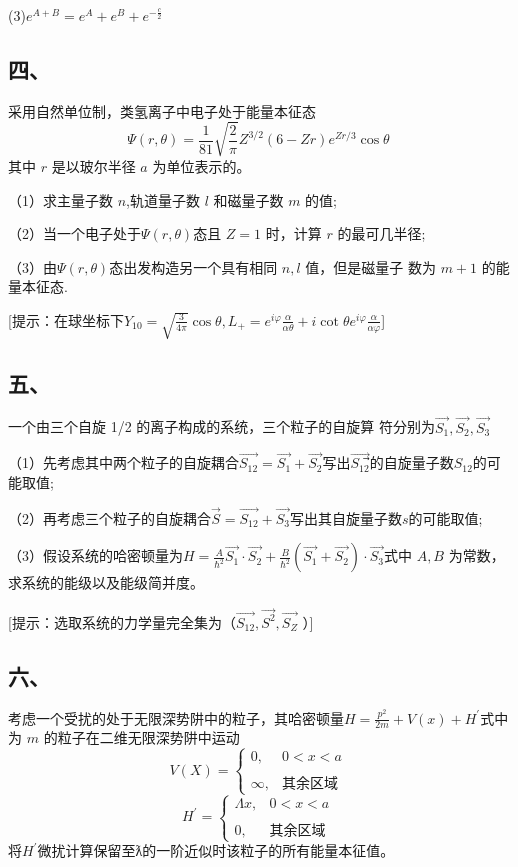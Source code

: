 (3)$e^{A+B} =e^A+e^B+e^{-\frac{c}{2}}$ 
\subsection{四、}

采用自然单位制，类氢离子中电子处于能量本征态
$$\Psi(r,\theta)=\frac{1}{81}\sqrt{\frac{2}{\pi}}Z^{3/2}(6-Zr)e^{Zr/3}\cos\theta~$$
其中 $r$ 是以玻尔半径 $a$ 为单位表示的。

（1）求主量子数 $n$,轨道量子数 $l$ 和磁量子数 $m$ 的值;

（2）当一个电子处于$\Psi(r,\theta)$态且 $Z=1$ 时，计算 $r$ 的最可几半径;

（3）由$\Psi(r,\theta)$态出发构造另一个具有相同 $n,l$ 值，但是磁量子
数为 $m+1$ 的能量本征态.

[提示：在球坐标下$Y_{10}=\sqrt{\frac{3}{4 \pi}}\cos\theta,L_+=e^{i\varphi}\frac{\alpha}{\alpha\theta}+i\cot\theta e^{i\varphi}\frac{\alpha}{\alpha\varphi}$]
\subsection{五、}
一个由三个自旋 1/2 的离子构成的系统，三个粒子的自旋算
符分别为$\vec{S_1},\vec{S_2},\vec{S_3}$

（1）先考虑其中两个粒子的自旋耦合$\vec{S_{12}}=\vec{S_1}+\vec{S_2}$写出$\vec{S_{12}}$⃗的自旋量子数$S_{12}$的可能取值;

（2）再考虑三个粒子的自旋耦合$\vec{S}=\vec{S_12}+\vec{S_3}$写出其自旋量子数$s$的可能取值;

（3）假设系统的哈密顿量为$H=\frac{A}{\hbar^2}\vec{S_1}\cdot\vec{S_2}+\frac{B}{\hbar^2}(\vec{S_1}+\vec{S_2})\cdot\vec{S_3}$式中 $A,B$ 为常数，求系统的能级以及能级简并度。

[提示：选取系统的力学量完全集为（$\vec{S_{12}} , \vec{S^2}  , \vec{S_Z}$ ）]
\subsection{六、}
考虑一个受扰的处于无限深势阱中的粒子，其哈密顿量$H=\frac{p^2}{2m}+V(x)+H^\prime$式中为 $m$ 的粒子在二维无限深势阱中运动
$$V(X)=\begin{cases}
0,&0 < x < a\\\\
\infty,&\text{其余区域}
\end{cases}~$$
$$H^\prime=\begin{cases}
\Lambda x ,&0 < x < a\\\\
0,&\text{其余区域}
\end{cases}~$$
将$H^\prime$微扰计算保留至ƛ的一阶近似时该粒子的所有能量本征值。